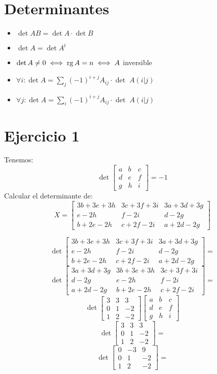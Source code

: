 \documentclass{article}
\begin{document}
\section*{Determinantes}
\begin{itemize}
	\item $\det AB = \det A \cdot \det B$
	\item $\det A = \det A^t$
	\item $\det A \neq 0 \iff \operatorname{rg} A = n \iff A$ inversible
	\item $\forall i: \det A = \sum_j (-1)^{i+j} A_{ij} \cdot \det \; A(i|j)$
	\item $\forall j: \det A = \sum_i (-1)^{i+j} A_{ij} \cdot \det \; A(i|j)$
\end{itemize}

\section*{Ejercicio 1}
Tenemos:
\[
	\det
	\begin{bmatrix}
		a & b & c \\
		d & e & f \\
		g & h & i
	\end{bmatrix}
	= -1
\]
Calcular el determinante de:
\[
	X = 
	\begin{bmatrix}
		3b+3e+3h & 3c+3f+3i & 3a + 3d + 3g \\
		e-2h & f - 2i & d - 2g \\
		b + 2e -2h & c+2f-2i & a+2d-2g
	\end{bmatrix}
\]

\[
	\det \begin{bmatrix}
		3b+3e+3h & 3c+3f+3i & 3a + 3d + 3g \\
		e-2h & f - 2i & d - 2g \\
		b + 2e -2h & c+2f-2i & a+2d-2g
	\end{bmatrix} = 
\]
\[
	\det \begin{bmatrix}
		3a + 3d + 3g & 3b+3e+3h & 3c+3f+3i\\
		d-2g & e-2h & f - 2i \\
		a + 2d - 2g & b + 2e -2h & c+2f-2i
	\end{bmatrix} = 
\]
\[
	\det \begin{bmatrix}
		3 & 3 & 3 \\
		0 & 1 & -2 \\
		1 & 2 & -2
	\end{bmatrix}
	\begin{bmatrix}
		a & b & c \\
		d & e & f \\
		g & h & i
	\end{bmatrix}
\]
\[
	\det \begin{bmatrix}
		3 & 3 & 3 \\
		0 & 1 & -2 \\
		1 & 2 & -2
	\end{bmatrix} =
\]
\[
	\det \begin{bmatrix}
		0 & -3 & 9 \\
		0 & 1 & -2 \\
		1 & 2 & -2
	\end{bmatrix} =
\]
\end{document}
